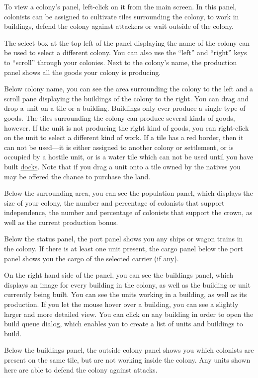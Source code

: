 \documentclass[12pt]{book}
\begin{document}
To view a colony's panel, left-click on it from the main screen. In
this panel, colonists can be assigned to cultivate tiles surrounding
the colony, to work in buildings, defend the colony against attackers
or wait outside of the colony.

The select box at the top left of the panel displaying the name of the
colony can be used to select a different colony. You can also use the
``left'' and ``right'' keys to ``scroll'' through your colonies. Next
to the colony's name, the production panel shows all the goods your
colony is producing.

Below colony name, you can see the area surrounding the colony to the
left and a scroll pane displaying the buildings of the colony to the
right. You can drag and drop a unit on a tile or a building. Buildings
only ever produce a single type of goods. The tiles surrounding the
colony can produce several kinds of goods, however. If the unit is not
producing the right kind of goods, you can right-click on the unit to
select a different kind of work. If a tile has a red border, then it
can not be used---it is either assigned to another colony or
settlement, or is occupied by a hostile unit, or is a water tile which
can not be used until you have built \hyperlink{Dock}{docks}. Note
that if you drag a unit onto a tile owned by the natives you may be
offered the chance to purchase the land.

Below the surrounding area, you can see the population panel, which
displays the size of your colony, the number and percentage of
colonists that support independence, the number and percentage of
colonists that support the crown, as well as the current production
bonus.

Below the status panel, the port panel shows you any ships or wagon
trains in the colony. If there is at least one unit present, the cargo
panel below the port panel shows you the cargo of the selected carrier
(if any).

On the right hand side of the panel, you can see the buildings panel,
which displays an image for every building in the colony, as well as
the building or unit currently being built. You can see the units
working in a building, as well as its production. If you let the mouse
hover over a building, you can see a slightly larger and more detailed
view. You can click on any building in order to open the build queue
dialog, which enables you to create a list of units and buildings to
build.

Below the buildings panel, the outside colony panel shows you which
colonists are present on the same tile, but are not working inside the
colony. Any units shown here are able to defend the colony against
attacks.
\end{document}
